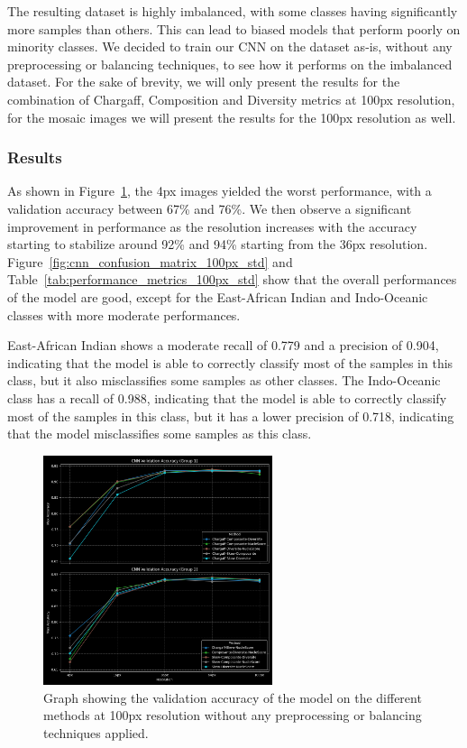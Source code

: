 The resulting dataset is highly imbalanced, with some classes having significantly more samples than others. This can lead to biased models
that perform poorly on minority classes. We decided to train our CNN on the dataset as-is, without any preprocessing or balancing techniques,
to see how it performs on the imbalanced dataset. For the sake of brevity, we will only present the results for the combination of Chargaff,
Composition and Diversity metrics at 100px resolution, for the mosaic images we will present the results for the 100px resolution as well.

\subsubsection{Results}
\label{subsubsec:results_initial_testing}

As shown in Figure~\ref{fig:cnn_validation_accuracy_std}, the 4px images yielded the worst performance, with a validation accuracy between 67\%
and 76\%. We then observe a significant improvement in performance as the resolution increases with the accuracy starting to stabilize
around 92\% and 94\% starting from the 36px resolution. Figure~\ref{fig:cnn_confusion_matrix_100px_std} and Table~\ref{tab:performance_metrics_100px_std}
show that the overall performances of the model are good, except for the East-African Indian and Indo-Oceanic classes with more moderate performances.

East-African Indian shows a moderate recall of 0.779 and a precision of 0.904, indicating that the model is able to correctly classify
most of the samples in this class, but it also misclassifies some samples as other classes. The Indo-Oceanic class has a recall of 0.988,
indicating that the model is able to correctly classify most of the samples in this class, but it has a lower precision of 0.718, indicating
that the model misclassifies some samples as this class.

\begin{figure}[H]
	\centering
	\includegraphics[width=0.6\textwidth]{../imgs/graphs/standard/cnn_validation_accuracy_groups_mask_5_std.png}
	\caption{Graph showing the validation accuracy of the model on the different methods at 100px resolution without any preprocessing or
		balancing techniques applied.}
	\label{fig:cnn_validation_accuracy_std}
\end{figure}

